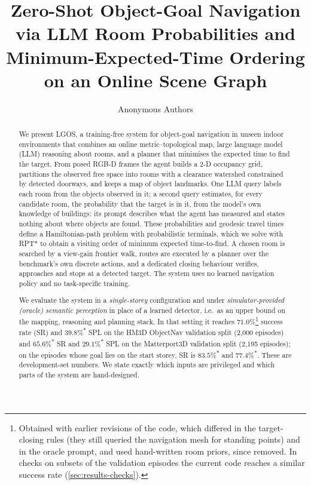 \documentclass[10pt]{article}
\title{Zero-Shot Object-Goal Navigation via LLM Room Probabilities and
Minimum-Expected-Time Ordering on an Online Scene Graph}
\author{Anonymous Authors}
\date{}
\newcommand{\ours}{LGOS\xspace}
\newcommand{\oldrev}{\textsuperscript{$\ast$}}
\begin{document}
\maketitle

\renewcommand{\thefootnote}{$\ast$}
\begin{abstract}
We present \ours, a training-free system for object-goal navigation in unseen
indoor environments that combines an online metric--topological map, large
language model (LLM) reasoning about rooms, and a planner that minimises the
expected time to find the target. From posed RGB-D frames the agent builds a
2-D occupancy grid, partitions the observed free space into rooms with a
clearance watershed constrained by detected doorways, and keeps a map of object
landmarks. One LLM query labels each room from the objects observed in it; a
second query estimates, for every candidate room, the probability that the
target is in it, from the model's own knowledge of buildings: its prompt
describes what the agent has measured and states nothing about where objects
are found. These probabilities and geodesic travel
times define a Hamiltonian-path problem with probabilistic terminals, which we
solve with RPT* to obtain a visiting order of minimum expected time-to-find. A
chosen room is searched by a view-gain frontier walk, routes are executed by a
planner over the benchmark's own discrete actions, and a dedicated closing
behaviour verifies, approaches and stops at a detected target. The system uses
no learned navigation policy and no task-specific training.

We evaluate the system in a \emph{single-storey} configuration and under
\emph{simulator-provided (oracle) semantic perception} in place of a learned
detector, i.e.\ as an upper bound on the mapping, reasoning and planning
stack. In that setting it reaches $71.0\%$\footnote{Obtained with earlier
revisions of the code, which differed in the target-closing rules (they still
queried the navigation mesh for standing points) and in the oracle prompt, and
used hand-written room priors, since removed. In checks on subsets of the
validation episodes the current code reaches a similar success rate
(\cref{sec:results-checks}).} success rate (SR) and
$39.8\%$\oldrev{} SPL on the HM3D ObjectNav validation split (2{,}000
episodes) and $65.6\%$\oldrev{} SR and $29.1\%$\oldrev{} SPL on the
Matterport3D validation split (2{,}195 episodes); on the episodes whose goal
lies on the start storey, SR is $83.5\%$\oldrev{} and $77.4\%$\oldrev{}. These
are development-set numbers. We state exactly which inputs are privileged and
which parts of the system are hand-designed.
\end{abstract}
\renewcommand{\thefootnote}{\arabic{footnote}}
\setcounter{footnote}{0}
\end{document}
